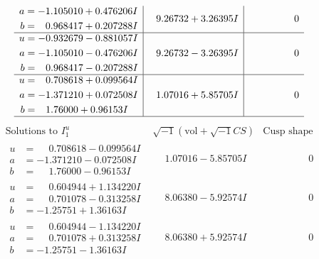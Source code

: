 \documentclass[1p]{elsarticle_modified}
\theoremstyle{definition}
\newcommand{\I}{\sqrt{-1}}
\begin{document}
$$\begin{array}{c|c|c}
\begin{aligned}
a &= -1.105010 + 0.476206 I \\
b &= \phantom{-}0.968417 + 0.207288 I\end{aligned}
 & \phantom{-}9.26732 + 3.26395 I & \phantom{-0.000000 } 0 \\ \hline\begin{aligned}
u &= -0.932679 - 0.881057 I \\
a &= -1.105010 - 0.476206 I \\
b &= \phantom{-}0.968417 - 0.207288 I\end{aligned}
 & \phantom{-}9.26732 - 3.26395 I & \phantom{-0.000000 } 0 \\ \hline\begin{aligned}
u &= \phantom{-}0.708618 + 0.099564 I \\
a &= -1.371210 + 0.072508 I \\
b &= \phantom{-}1.76000 + 0.96153 I\end{aligned}
 & \phantom{-}1.07016 + 5.85705 I & \phantom{-0.000000 } 0\\
 \hline 
 \end{array}$$\newpage$$\begin{array}{c|c|c}  
\text{Solutions to }I^u_{1}& \I (\text{vol} + \sqrt{-1}CS) & \text{Cusp shape}\\
 \hline 
\begin{aligned}
u &= \phantom{-}0.708618 - 0.099564 I \\
a &= -1.371210 - 0.072508 I \\
b &= \phantom{-}1.76000 - 0.96153 I\end{aligned}
 & \phantom{-}1.07016 - 5.85705 I & \phantom{-0.000000 } 0 \\ \hline\begin{aligned}
u &= \phantom{-}0.604944 + 1.134220 I \\
a &= \phantom{-}0.701078 - 0.313258 I \\
b &= -1.25751 + 1.36163 I\end{aligned}
 & \phantom{-}8.06380 - 5.92574 I & \phantom{-0.000000 } 0 \\ \hline\begin{aligned}
u &= \phantom{-}0.604944 - 1.134220 I \\
a &= \phantom{-}0.701078 + 0.313258 I \\
b &= -1.25751 - 1.36163 I\end{aligned}
 & \phantom{-}8.06380 + 5.92574 I & \phantom{-0.000000 } 0 \\ \hline\begin{aligned}

\end{aligned}
\end{array}$$
\end{document}
